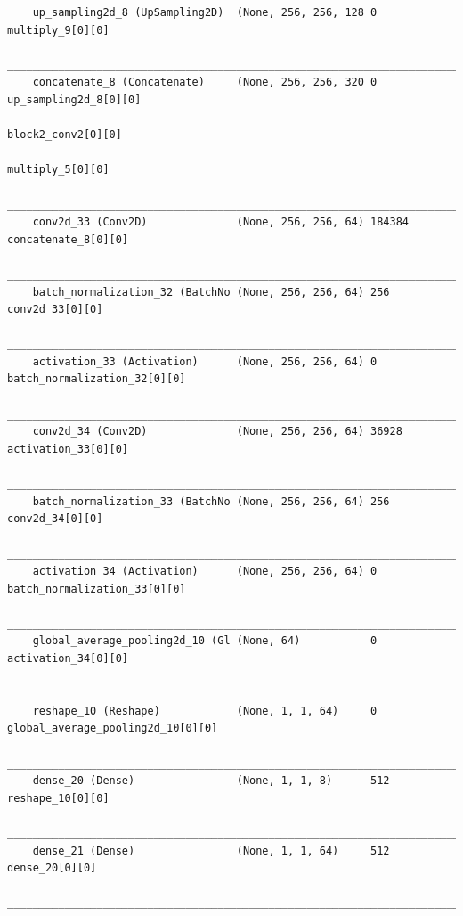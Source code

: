 {\begin{verbatim}
    up_sampling2d_8 (UpSampling2D)  (None, 256, 256, 128 0           multiply_9[0][0]                 
    __________________________________________________________________________________________________
    concatenate_8 (Concatenate)     (None, 256, 256, 320 0           up_sampling2d_8[0][0]            
                                                                        block2_conv2[0][0]               
                                                                        multiply_5[0][0]                 
    __________________________________________________________________________________________________
    conv2d_33 (Conv2D)              (None, 256, 256, 64) 184384      concatenate_8[0][0]              
    __________________________________________________________________________________________________
    batch_normalization_32 (BatchNo (None, 256, 256, 64) 256         conv2d_33[0][0]                  
    __________________________________________________________________________________________________
    activation_33 (Activation)      (None, 256, 256, 64) 0           batch_normalization_32[0][0]     
    __________________________________________________________________________________________________
    conv2d_34 (Conv2D)              (None, 256, 256, 64) 36928       activation_33[0][0]              
    __________________________________________________________________________________________________
    batch_normalization_33 (BatchNo (None, 256, 256, 64) 256         conv2d_34[0][0]                  
    __________________________________________________________________________________________________
    activation_34 (Activation)      (None, 256, 256, 64) 0           batch_normalization_33[0][0]     
    __________________________________________________________________________________________________
    global_average_pooling2d_10 (Gl (None, 64)           0           activation_34[0][0]              
    __________________________________________________________________________________________________
    reshape_10 (Reshape)            (None, 1, 1, 64)     0           global_average_pooling2d_10[0][0]
    __________________________________________________________________________________________________
    dense_20 (Dense)                (None, 1, 1, 8)      512         reshape_10[0][0]                 
    __________________________________________________________________________________________________
    dense_21 (Dense)                (None, 1, 1, 64)     512         dense_20[0][0]                   
    __________________________________________________________________________________________________

\end{verbatim}}
